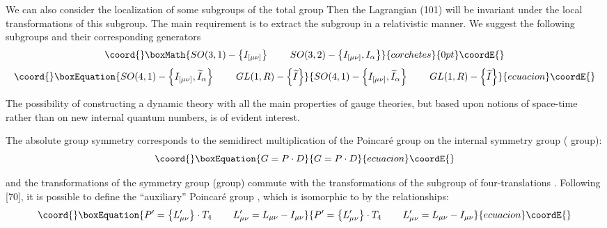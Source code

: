 \documentclass[a4paper,12pt]{article}
\begin{document}
We can also consider the localization of some subgroups of the
total group \coordHE{} Then the Lagrangian (101) will be
invariant under the local transformations of this subgroup. The
main requirement is to extract the subgroup in a relativistic
manner. We suggest the following subgroups and their corresponding
generators
\[\coord{}\boxMath{
SO(3,1)-\left\{ I_{[\mu \nu ]}\right\} \hspace{0.3in}SO(3,2)-\left\{ I_{[\mu
\nu ]},I_\alpha \right\}
}{corchetes}{0pt}\coordE{}\]
\begin{equation}\coord{}\boxEquation{
SO(4,1)-\left\{ I_{[\mu \nu ]},\widetilde{I}_\alpha \right\}
\hspace{0.3in} GL(1,R)-\left\{ \widetilde{I}\right\}  \label{109}
}{
SO(4,1)-\left\{ I_{[\mu \nu ]},\widetilde{I}_\alpha \right\}
\hspace{0.3in} GL(1,R)-\left\{ \widetilde{I}\right\}  }{ecuacion}\coordE{}\end{equation}

The possibility of constructing a dynamic theory with all the main
properties of gauge theories, but based upon notions of space-time rather
than on new internal quantum numbers, is of evident interest.

The absolute group symmetry \coordHE{} corresponds to the semidirect multiplication
of the Poincar\'e group \coordHE{} on the internal symmetry group \coordHE{} (\coordHE{}
group):
\begin{equation}\coord{}\boxEquation{
G=P\cdot D  \label{110}
}{
G=P\cdot D  }{ecuacion}\coordE{}\end{equation}

and the transformations of the symmetry group (\coordHE{}group) commute with the
transformations of the subgroup of four-translations \coordHE{}. Following [70],
it is possible to define the ``auxiliary'' Poincar\'e group \coordHE{},
which is isomorphic to \coordHE{} by the relationships:
\begin{equation}\coord{}\boxEquation{
P^{\prime }=\left\{ L_{\mu \nu }^{\prime }\right\} \cdot
T_4\hspace{0.3in} L_{\mu \nu }^{\prime }=L_{\mu \nu }-I_{\mu \nu }
\label{111}
}{
P^{\prime }=\left\{ L_{\mu \nu }^{\prime }\right\} \cdot
T_4\hspace{0.3in} L_{\mu \nu }^{\prime }=L_{\mu \nu }-I_{\mu \nu }
}{ecuacion}\coordE{}\end{equation}
\end{document}

